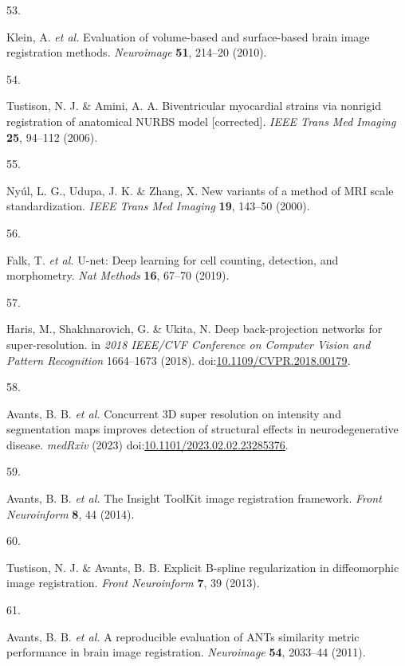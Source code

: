 \documentclass[
  12pt,
]{article}
\newlength{\cslhangindent}
\newlength{\csllabelwidth}
\newenvironment{CSLReferences}[2] %
 {%
  \setlength{\parindent}{0pt}
  \ifodd #1 \everypar{\setlength{\hangindent}{\cslhangindent}}\ignorespaces\fi
  \ifnum #2 > 0
  \setlength{\parskip}{#2\baselineskip}
  \fi
 }%
 {}
\newcommand{\CSLLeftMargin}[1]{\parbox[t]{\csllabelwidth}{#1}}
\newcommand{\CSLRightInline}[1]{\parbox[t]{\linewidth - \csllabelwidth}{#1}\break}
\begin{document}
\begin{CSLReferences}{0}{0}
\leavevmode{}%
\CSLLeftMargin{53. }
\CSLRightInline{Klein, A. \emph{et al.} Evaluation of volume-based and
surface-based brain image registration methods. \emph{Neuroimage}
\textbf{51}, 214--20 (2010).}

\leavevmode{}%
\CSLLeftMargin{54. }
\CSLRightInline{Tustison, N. J. \& Amini, A. A. Biventricular myocardial
strains via nonrigid registration of anatomical {NURBS} model
{[}corrected{]}. \emph{IEEE Trans Med Imaging} \textbf{25}, 94--112
(2006).}

\leavevmode{}%
\CSLLeftMargin{55. }
\CSLRightInline{Nyúl, L. G., Udupa, J. K. \& Zhang, X. New variants of a
method of MRI scale standardization. \emph{IEEE Trans Med Imaging}
\textbf{19}, 143--50 (2000).}

\leavevmode{}%
\CSLLeftMargin{56. }
\CSLRightInline{Falk, T. \emph{et al.} U-net: Deep learning for cell
counting, detection, and morphometry. \emph{Nat Methods} \textbf{16},
67--70 (2019).}

\leavevmode{}%
\CSLLeftMargin{57. }
\CSLRightInline{Haris, M., Shakhnarovich, G. \& Ukita, N. Deep
back-projection networks for super-resolution. in \emph{2018 {IEEE/CVF}
{C}onference on {C}omputer {V}ision and {P}attern {R}ecognition}
1664--1673 (2018).
doi:\href{https://doi.org/10.1109/CVPR.2018.00179}{10.1109/CVPR.2018.00179}.}

\leavevmode{}%
\CSLLeftMargin{58. }
\CSLRightInline{Avants, B. B. \emph{et al.} Concurrent 3D super
resolution on intensity and segmentation maps improves detection of
structural effects in neurodegenerative disease. \emph{medRxiv} (2023)
doi:\href{https://doi.org/10.1101/2023.02.02.23285376}{10.1101/2023.02.02.23285376}.}

\leavevmode{}%
\CSLLeftMargin{59. }
\CSLRightInline{Avants, B. B. \emph{et al.} The {Insight} {ToolKit}
image registration framework. \emph{Front Neuroinform} \textbf{8}, 44
(2014).}

\leavevmode{}%
\CSLLeftMargin{60. }
\CSLRightInline{Tustison, N. J. \& Avants, B. B. Explicit {B}-spline
regularization in diffeomorphic image registration. \emph{Front
Neuroinform} \textbf{7}, 39 (2013).}

\leavevmode{}%
\CSLLeftMargin{61. }
\CSLRightInline{Avants, B. B. \emph{et al.} A reproducible evaluation of
ANTs similarity metric performance in brain image registration.
\emph{Neuroimage} \textbf{54}, 2033--44 (2011).}

\end{CSLReferences}
\end{document}
